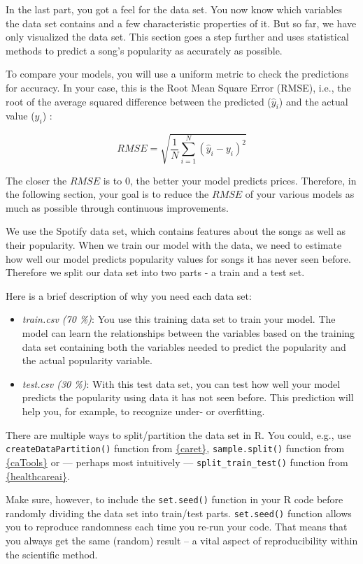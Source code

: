 \documentclass[
  11pt,
]{book}
\newenvironment{tips}[1]
  {
  \begin{itemize}
  \footnotesize
  \renewcommand{\labelitemi}{
    \raisebox{-.7\height}[0pt][0pt]{
      {\setkeys{Gin}{width=3em,keepaspectratio}
        \texttt{[image: images/\#1.png]}}
    }
  }
  \setlength{\fboxsep}{1em}
  \begin{rbox}
  \item
  }
  {
  \end{rbox}
  \end{itemize}
  }
\begin{document}
In the last part, you got a feel for the data set. You now know which variables the data set contains and a few characteristic properties of it. But so far, we have only visualized the data set. This section goes a step further and uses statistical methods to predict a song's popularity as accurately as possible.

To compare your models, you will use a uniform metric to check the predictions for accuracy. In your case, this is the Root Mean Square Error (RMSE), i.e., the root of the average squared difference between the predicted (\(\hat{y}_i\)) and the actual value (\(y_i\)) :

\[ RMSE = \sqrt{\frac{1}{N}\sum_{i=1}^{N}{(\hat{y}_i-y_i)^2}} \]

The closer the \(RMSE\) is to 0, the better your model predicts prices. Therefore, in the following section, your goal is to reduce the \(RMSE\) of your various models as much as possible through continuous improvements.

We use the Spotify data set, which contains features about the songs as well as their popularity. When we train our model with the data, we need to estimate how well our model predicts popularity values for songs it has never seen before. Therefore we split our data set into two parts - a train and a test set.

Here is a brief description of why you need each data set:

\begin{itemize}
\item
  \emph{train.csv (70 \%)}: You use this training data set to train your model. The model can learn the relationships between the variables based on the training data set containing both the variables needed to predict the popularity and the actual popularity variable.
\item
  \emph{test.csv (30 \%)}: With this test data set, you can test how well your model predicts the popularity using data it has not seen before. This prediction will help you, for example, to recognize under- or overfitting.
\end{itemize}

\begin{tips}r

There are multiple ways to split/partition the data set in R. You could, e.g., use \texttt{createDataPartition()} function from \href{https://cran.r-project.org/package=caret}{\{caret\}}, \texttt{sample.split()} function from \href{https://cran.r-project.org/package=caTools}{\{caTools\}} or --- perhaps most intuitively --- \texttt{split\_train\_test()} function from \href{https://CRAN.R-project.org/package=healthcareai}{\{healthcareai\}}.

Make sure, however, to include the \texttt{set.seed()} function in your R code before randomly dividing the data set into train/test parts. \texttt{set.seed()} function allows you to reproduce randomness each time you re-run your code. That means that you always get the same (random) result -- a vital aspect of reproducibility within the scientific method.

\end{tips}
\end{document}

